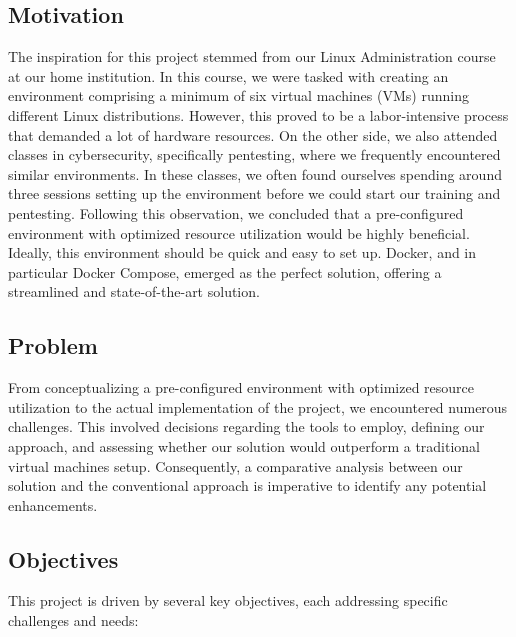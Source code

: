 \documentclass[a4paper,11pt,singlespacing]{article}
\begin{document}
\subsection{Motivation}
The inspiration for this project stemmed from our Linux Administration course at our home
institution. In this course, we were tasked with creating an environment comprising a minimum of six virtual machines (VMs) running different Linux distributions. However, this proved to be a labor-intensive process that demanded a lot of hardware resources.
On the other side, we also attended classes in cybersecurity, specifically pentesting, where we frequently encountered similar environments. In these classes, we often found ourselves spending around three sessions setting up the environment before we could start our training and pentesting.
Following this observation, we concluded that a pre-configured environment with optimized resource utilization would be highly beneficial. Ideally, this environment should be quick and easy to set up. Docker, and in particular Docker Compose, emerged as the perfect solution, offering a streamlined and state-of-the-art solution.            

\subsection{Problem}
From conceptualizing a pre-configured environment with optimized resource utilization to the actual implementation of the project, we encountered numerous challenges. This involved decisions regarding the tools to employ, defining our approach, and assessing whether our solution would outperform a traditional virtual machines setup. Consequently, a comparative analysis between our solution and the conventional approach is imperative to identify any potential enhancements.

\subsection{Objectives}
This project is driven by several key objectives, each addressing specific challenges and needs:
\end{document}
